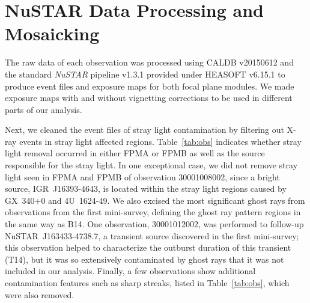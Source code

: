 \documentclass[iop,revtex4]{emulateapj}
\begin{document}
\section{NuSTAR Data Processing and Mosaicking}
\label{sec:processing}
The raw data of each observation was processed using CALDB v20150612 and the standard \textit{NuSTAR} pipeline v1.3.1 provided under HEASOFT v6.15.1 to produce event files and exposure maps for both focal plane modules.  We made exposure maps with and without vignetting corrections to be used in different parts of our analysis. \par
Next, we cleaned the event files of stray light contamination by filtering out X-ray events in stray light affected regions.  Table~\ref{tab:obs} indicates whether stray light removal occurred in either FPMA or FPMB as well as the source responsible for the stray light.  In one exceptional case, we did not remove stray light seen in FPMA and FPMB of observation 30001008002, since a bright source, IGR~J16393-4643, is located within the stray light regions caused by GX~340+0 and 4U~1624-49.  We also excised the most significant ghost rays from observations from the first mini-survey, defining the ghost ray pattern regions in the same way as B14.  One observation, 30001012002, was performed to follow-up NuSTAR~J163433-4738.7, a transient source discovered in the first mini-survey; this observation helped to characterize the outburst duration of this transient (T14), but it was so extensively contaminated by ghost rays that it was not included in our analysis. Finally, a few observations show additional contamination features such as sharp streaks, listed in Table~\ref{tab:obs}, which were also removed.  \par
\end{document}
